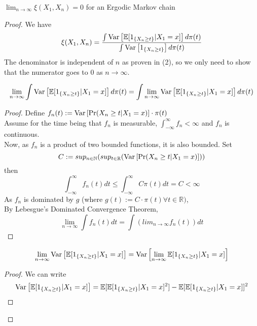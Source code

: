\begin{theorem}
    $\lim_{n \rightarrow \infty} \xi(X_1, X_{n}) = 0$ for an Ergodic Markov chain
    \begin{proof}
        We have
        \begin{equation*}
            \xi(X_1, X_{n}) = \frac{\int \text{Var}\left[{{\mathbb{E}[1_{\{X_{n} \geq t\}}|X_1=x]}}\right] d\pi(t)}{\int \text{Var}\left[{{1_{\{X_{n} \geq t\}}}}\right] d\pi(t)}
        \end{equation*}
        The denominator is independent of $n$ as proven in (2), so we only need to show that the numerator goes to 0 as $n \rightarrow \infty$.\\
        \begin{lem}
            $$\lim_{n \rightarrow \infty} \int \text{Var}\left[{{\mathbb{E}[1_{\{X_{n} \geq t\}}|X_1=x]}}\right] d\pi(t) = \int \lim_{n \rightarrow \infty}\text{Var}\left[{{\mathbb{E}[1_{\{X_{n} \geq t\}}|X_1=x]}}\right] d\pi(t)$$
            \begin{proof}
                Define $f_n(t) := \text{Var}\left[{{\Pr(X_{n} \geq t | X_{1} = x)}}\right] \cdot \pi(t) $ \\
                Assume for the time being that $f_n$ is measurable, $\int_{-\infty}^{\infty} f_n < \infty$ and $f_n$ is continuous.\\
                Now, as $f_n$ is a product of two bounded functions, it is also bounded.
                Set
                $$ C:= sup_{n \in \mathbb{N}} (sup_{t \in \mathbb{R}} (\text{Var}\left[{{\Pr(X_{n} \geq t | X_{1} = x)}}\right]))$$
                then
                $$\int_{-\infty}^{\infty} f_n(t)dt \leq \int_{-\infty}^{\infty} C\pi(t)dt = C < \infty$$
                As $f_n$ is dominated by $g$ (where $g(t) := C\cdot\pi(t) \forall t \in \mathbb{R})$, \\
                By Lebesgue's Dominated Convergence Theorem,
                $$\lim_{n \rightarrow \infty} \int f_n(t) dt = \int (lim_{n \rightarrow \infty} f_n(t)) dt$$
            \end{proof}
        \end{lem}
        \begin{lem}
            $$\lim_{n \rightarrow \infty} \text{Var}\left[{{\mathbb{E}[1_{\{X_{n} \geq t\}}|X_1=x]}}\right] = \text{Var}\left[{{\lim_{n \rightarrow \infty} \mathbb{E}[1_{\{X_{n} \geq t\}}|X_1=x]}}\right]$$
            \begin{proof}
                We can write
                \begin{align*}
                    \Var{\mathbb{E}[1_{\{X_{n} \geq t\}}|X_1=x]} &= \mathbb{E}[\mathbb{E}[1_{\{X_{n} \geq t\}}|X_1=x]^2] - \mathbb{E}[\mathbb{E}[1_{\{X_{n} \geq t\}}|X_1=x]]^2 \\

\end{align*}
\end{proof}
\end{lem}
\end{proof}
\end{theorem}
